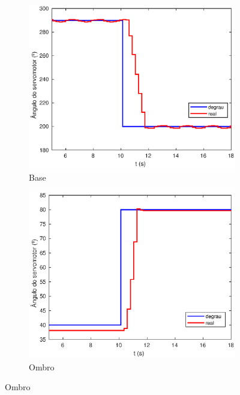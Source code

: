 \begin{figure}[h!]
  
  \centering
  \begin{subfigure}{.5\textwidth}
    \centering
    \includegraphics[width = 1.1\columnwidth]{Imagens/base_ma}
    \caption{Base}
    \label{fig:base_ma}
  \end{subfigure}%
  \begin{subfigure}{.5\textwidth}
    \centering
    \includegraphics[width = 1.1\columnwidth]{Imagens/shoulder_ma}
    \caption{Ombro}
    \label{fig:shoulder_ma}
  \end{subfigure}%
\end{figure}

